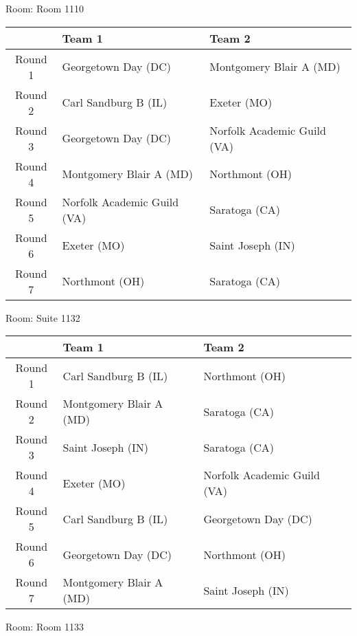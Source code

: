 \documentclass{article}%
\begin{document}
\vspace*{8pt}%
\linebreak%
\begin{flushleft}%
\begin{Large}%
Room: Room 1110%
\end{Large}%
\end{flushleft}%
\begin{tabularx}{\textwidth}{|c|Y|Y|}%
\hline%
&Team 1&Team 2\\%
\hline%
Round 1&Georgetown Day (DC)&Montgomery Blair A (MD)\\%
Round 2&Carl Sandburg B (IL)&Exeter (MO)\\%
Round 3&Georgetown Day (DC)&Norfolk Academic Guild (VA)\\%
Round 4&Montgomery Blair A (MD)&Northmont (OH)\\%
Round 5&Norfolk Academic Guild (VA)&Saratoga (CA)\\%
Round 6&Exeter (MO)&Saint Joseph (IN)\\%
Round 7&Northmont (OH)&Saratoga (CA)\\%
\hline%
\end{tabularx}%
\vspace*{8pt}%
\linebreak%
\begin{flushleft}%
\begin{Large}%
Room: Suite 1132%
\end{Large}%
\end{flushleft}%
\begin{tabularx}{\textwidth}{|c|Y|Y|}%
\hline%
&Team 1&Team 2\\%
\hline%
Round 1&Carl Sandburg B (IL)&Northmont (OH)\\%
Round 2&Montgomery Blair A (MD)&Saratoga (CA)\\%
Round 3&Saint Joseph (IN)&Saratoga (CA)\\%
Round 4&Exeter (MO)&Norfolk Academic Guild (VA)\\%
Round 5&Carl Sandburg B (IL)&Georgetown Day (DC)\\%
Round 6&Georgetown Day (DC)&Northmont (OH)\\%
Round 7&Montgomery Blair A (MD)&Saint Joseph (IN)\\%
\hline%
\end{tabularx}%
\vspace*{8pt}%
\linebreak%
\begin{flushleft}%
\begin{Large}%
Room: Room 1133%
\end{Large}%
\end{flushleft}%
\end{document}

